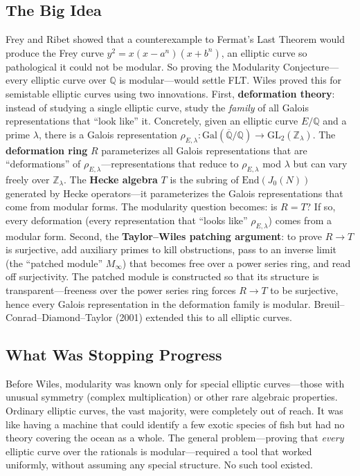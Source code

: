 \subsection{The Big Idea}
Frey and Ribet showed that a counterexample to Fermat's Last Theorem would produce the Frey curve $y^2 = x(x-a^n)(x+b^n)$, an elliptic curve so pathological it could not be modular. So proving the Modularity Conjecture---every elliptic curve over $\mathbb{Q}$ is modular---would settle FLT. Wiles proved this for semistable elliptic curves using two innovations. First, \textbf{deformation theory}: instead of studying a single elliptic curve, study the \emph{family} of all Galois representations that ``look like'' it. Concretely, given an elliptic curve $E/\mathbb{Q}$ and a prime $\lambda$, there is a Galois representation $\rho_{E,\lambda}: \text{Gal}(\overline{\mathbb{Q}}/\mathbb{Q}) \to \text{GL}_2(\mathbb{Z}_\lambda)$. The \textbf{deformation ring} $R$ parameterizes all Galois representations that are ``deformations'' of $\rho_{E,\lambda}$---representations that reduce to $\rho_{E,\lambda}$ mod $\lambda$ but can vary freely over $\mathbb{Z}_\lambda$. The \textbf{Hecke algebra} $T$ is the subring of $\text{End}(J_0(N))$ generated by Hecke operators---it parameterizes the Galois representations that come from modular forms. The modularity question becomes: is $R = T$? If so, every deformation (every representation that ``looks like'' $\rho_{E,\lambda}$) comes from a modular form. Second, the \textbf{Taylor--Wiles patching argument}: to prove $R \to T$ is surjective, add auxiliary primes to kill obstructions, pass to an inverse limit (the ``patched module'' $M_\infty$) that becomes free over a power series ring, and read off surjectivity. The patched module is constructed so that its structure is transparent---freeness over the power series ring forces $R \to T$ to be surjective, hence every Galois representation in the deformation family is modular. Breuil--Conrad--Diamond--Taylor (2001) extended this to all elliptic curves.

\subsection{What Was Stopping Progress}
Before Wiles, modularity was known only for special elliptic curves---those with unusual symmetry (complex multiplication) or other rare algebraic properties. Ordinary elliptic curves, the vast majority, were completely out of reach. It was like having a machine that could identify a few exotic species of fish but had no theory covering the ocean as a whole. The general problem---proving that \emph{every} elliptic curve over the rationals is modular---required a tool that worked uniformly, without assuming any special structure. No such tool existed.

